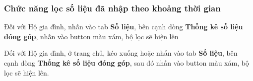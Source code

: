 \subsubsection{Chức năng lọc số liệu đã nhập theo khoảng thời gian}
Đối với Hộ gia đình, nhấn vào tab \textbf{Số liệu}, bên cạnh dòng \textbf{Thống kê số liệu đóng góp}, nhấn vào button màu xám, bộ lọc sẽ hiện lên

Đối với Hộ gia đình, ở trang chủ, kéo xuống hoặc nhấn vào tab \textbf{Số liệu}, bên cạnh dòng \textbf{Thống kê số liệu đóng góp}, sau đó nhấn vào button màu xám, bộ lọc sẽ hiện lên.

\begin{figure}[H]
  \centering
  \hfill

\end{figure}
